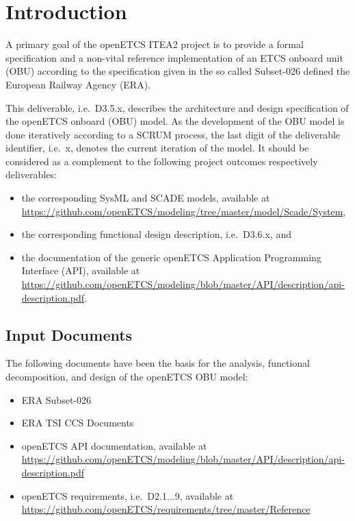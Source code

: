 
\chapter{Introduction}

A primary goal of the openETCS ITEA2 project is to provide a formal specification and a non-vital reference implementation of an ETCS onboard unit (OBU) according to the specification given in the so called Subset-026 \cite{subset-026} defined the European Railway Agency (ERA). 

This deliverable, i.e.~D3.5.x, describes the architecture and design specification of the openETCS onboard (OBU) model. As the development of the OBU model is done iteratively according to a SCRUM process, the last digit of the deliverable identifier, i.e.~x, denotes the current iteration of the model. It should be considered as a complement to the following project outcomes respectively deliverables:
\begin{itemize}
\item the corresponding SysML and SCADE models, available at \url{https://github.com/openETCS/modeling/tree/master/model/Scade/System},
\item the corresponding functional design description, i.e.~D3.6.x, and
\item the documentation of the generic openETCS Application Programming Interface (API), available at \url{https://github.com/openETCS/modeling/blob/master/API/description/api-description.pdf}.
\end{itemize}


\section{Input Documents}

The following documents have been the basis for the analysis, functional decomposition, and design of the openETCS OBU model:
\begin{itemize}
\item ERA Subset-026 \cite{subset-026}
\item ERA TSI CCS Documents
\item openETCS API documentation, available at \url{https://github.com/openETCS/modeling/blob/master/API/description/api-description.pdf}
\item openETCS requirements, i.e.~D2.1$\ldots$9, available at \url{https://github.com/openETCS/requirements/tree/master/Reference}
\end{itemize}


